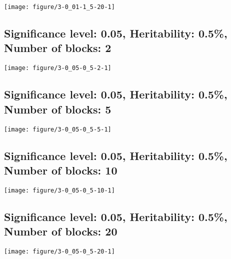 \documentclass[11pt,letter]{article}\usepackage[]{graphicx}\usepackage[]{color}
\makeatletter
\def\maxwidth{ %
  \ifdim\Gin@nat@width>\linewidth
    \linewidth
  \else
    \Gin@nat@width
  \fi
}
\newenvironment{knitrout}{}{} %
\makeatother
\begin{document}
\begin{knitrout}
\color{fgcolor}
\texttt{[image: figure/3-0\_01-1\_5-20-1]} 

\end{knitrout}

\newpage
\subsection{Significance level: 0.05, Heritability: 0.5\%, Number of blocks: 2}

\begin{knitrout}
\color{fgcolor}
\texttt{[image: figure/3-0\_05-0\_5-2-1]} 

\end{knitrout}

\newpage
\subsection{Significance level: 0.05, Heritability: 0.5\%, Number of blocks: 5}

\begin{knitrout}
\color{fgcolor}
\texttt{[image: figure/3-0\_05-0\_5-5-1]} 

\end{knitrout}

\newpage
\subsection{Significance level: 0.05, Heritability: 0.5\%, Number of blocks: 10}

\begin{knitrout}
\color{fgcolor}
\texttt{[image: figure/3-0\_05-0\_5-10-1]} 

\end{knitrout}

\newpage
\subsection{Significance level: 0.05, Heritability: 0.5\%, Number of blocks: 20}

\begin{knitrout}
\color{fgcolor}
\texttt{[image: figure/3-0\_05-0\_5-20-1]} 

\end{knitrout}
\end{document}
